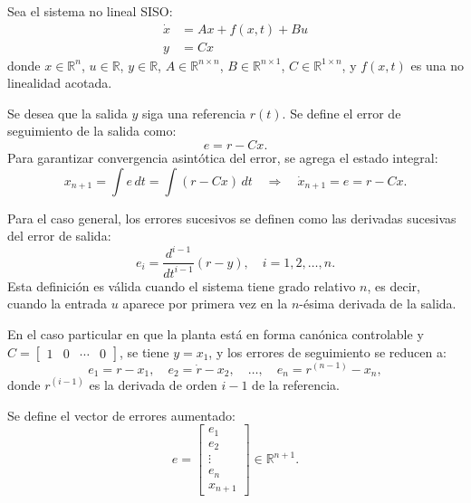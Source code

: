 \begin{itemize}
    Sea el sistema no lineal SISO:
\begin{equation*}
    \begin{aligned}
        \dot{x} &= A x + f(x,t) + B u \\
        y &= C x
    \end{aligned}
\end{equation*}
donde \(x \in \mathbb{R}^n\), \(u \in \mathbb{R}\), \(y \in \mathbb{R}\), \(A \in \mathbb{R}^{n \times n}\), \(B \in \mathbb{R}^{n \times 1}\), \(C \in \mathbb{R}^{1 \times n}\), y \(f(x,t)\) es una no linealidad acotada.

Se desea que la salida \(y\) siga una referencia \(r(t)\). Se define el error de seguimiento de la salida como:
\begin{equation*}
    e = r - C x.
\end{equation*}
Para garantizar convergencia asintótica del error, se agrega el estado integral:
\begin{equation*}
    x_{n+1} = \int e \, dt = \int (r - C x) \, dt \quad \Rightarrow \quad \dot{x}_{n+1} = e = r - C x.
\end{equation*}

Para el caso general, los errores sucesivos se definen como las derivadas sucesivas del error de salida:
\begin{equation*}
    e_i = \frac{d^{i-1}}{dt^{i-1}}(r - y), \quad i = 1, 2, \dots, n.
\end{equation*}
Esta definición es válida cuando el sistema tiene grado relativo \(n\), es decir, cuando la entrada \(u\) aparece por primera vez en la \(n\)-ésima derivada de la salida.

En el caso particular en que la planta está en forma canónica controlable  y \(C = \begin{bmatrix} 1 & 0 & \cdots & 0 \end{bmatrix}\), se tiene \(y = x_1\), y los errores de seguimiento se reducen a:
\begin{equation*}
    e_1 = r - x_1, \quad e_2 = \dot{r} - x_2, \quad \dots, \quad e_n = r^{(n-1)} - x_n,
\end{equation*}
donde \(r^{(i-1)}\) es la derivada de orden \(i-1\) de la referencia.

Se define el vector de errores aumentado:
\begin{equation*}
    e = \begin{bmatrix} e_1 \\ e_2 \\ \vdots \\ e_n \\ x_{n+1} \end{bmatrix} \in \mathbb{R}^{n+1}.
\end{equation*}


\end{itemize}
